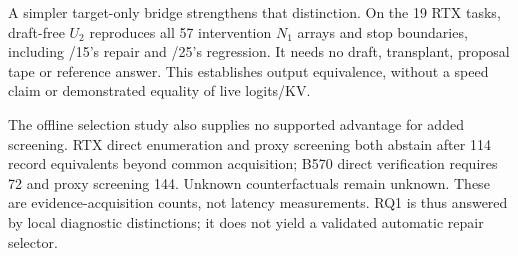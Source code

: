 A simpler target-only bridge strengthens that distinction. On the 19 RTX tasks, draft-free $U_2$ reproduces all 57 intervention $N_1$ arrays and stop boundaries, including /15's repair and /25's regression. It needs no draft, transplant, proposal tape or reference answer. This establishes output equivalence, without a speed claim or demonstrated equality of live logits/KV.

The offline selection study also supplies no supported advantage for added screening. RTX direct enumeration and proxy screening both abstain after 114 record equivalents beyond common acquisition; B570 direct verification requires 72 and proxy screening 144. Unknown counterfactuals remain unknown. These are evidence-acquisition counts, not latency measurements. RQ1 is thus answered by local diagnostic distinctions; it does not yield a validated automatic repair selector.
